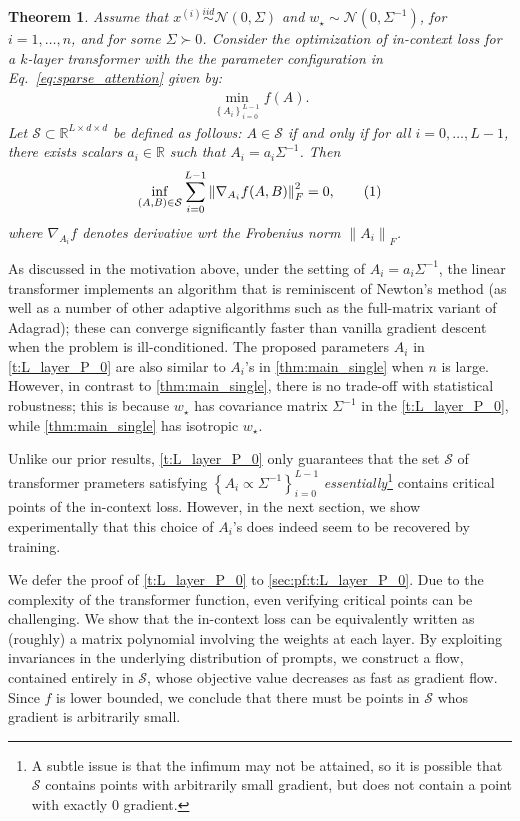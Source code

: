 \documentclass{article}
\newcommand{\R}{\mathbb{R}}
\renewcommand{\S}{{\mathcal S}}
\newtheorem{theorem}{Theorem}
\newcommand{\bb}{A}
\newcommand{\wstar}{w_\star}
\newcommand{\tx}[1]{x^{(#1)}}
\newcommand*\lrn[1]{\left\| #1 \right\|}
\newcommand*\lrp[1]{\left( #1 \right)}
\newcommand*\lrbb[1]{\left\{ #1 \right\}}
\newcommand\numberthis{\addtocounter{equation}{1}\tag{\theequation}}
\begin{document}
\begin{theorem}\label{t:L_layer_P_0}  
Assume that $\tx{i} \overset{iid}{\sim} \mathcal{N}(0,\Sigma)$ and $\wstar \sim \mathcal{N}(0,\Sigma^{-1})$, for $i=1,\dots, n$, and for some $\Sigma \succ 0$. Consider the optimization of in-context loss for a $k$-layer transformer with the the parameter configuration in Eq.~\eqref{eq:sparse_attention} given by:
\begin{align}
\min_{\lrbb{A_i}_{i=0}^{L-1}} f \lrp{A}.
\end{align}
Let $\S \subset \R^{L \times d \times d}$ be defined as follows: $A \in \S$ if and only if for all $i = 0,\dots,L-1$, there exists scalars $a_i\in \R$ such that $A_i = a_i \Sigma^{-1}$. Then
\begin{align*}
\inf_{(A,B) \in \S} \sum_{i=0}^{L-1} \lrn{\nabla_{A_i} f(A,B)}_F^2 = 0,
\numberthis \label{e:T:near-stationarity_P0}
\end{align*}
where $\nabla_{A_i} f$ denotes derivative wrt the Frobenius norm $\lrn{A_i}_F$.

\end{theorem}

As discussed in the motivation above, under the setting of $A_i = a_i \Sigma^{-1}$, the linear transformer implements an algorithm that is reminiscent of Newton's method (as well as a number of other adaptive algorithms such as the full-matrix variant of Adagrad); these can converge significantly faster than vanilla gradient descent when the problem is ill-conditioned. The proposed parameters $A_i$ in \autoref{t:L_layer_P_0} are also similar to $\bb_i$'s in \autoref{thm:main_single} when $n$ is large. However, in contrast to \autoref{thm:main_single}, there is no trade-off with statistical robustness; this is because $\wstar$ has covariance matrix $\Sigma^{-1}$ in the \autoref{t:L_layer_P_0}, while \autoref{thm:main_single} has isotropic $\wstar$.

Unlike our prior results, \autoref{t:L_layer_P_0} only guarantees that the set $\S$ of transformer prameters satisfying $\lrbb{A_i \propto \Sigma^{-1}}_{i=0}^{L-1}$ \emph{essentially}\footnote{A subtle issue is that the infimum may not be attained, so it is possible that $\S$ contains points with arbitrarily small gradient, but does not contain a point with exactly $0$ gradient.} contains critical points of the in-context loss. However, in the next section, we show experimentally that this choice of $A_i$'s does indeed seem to be recovered by training. 

We defer the proof of \autoref{t:L_layer_P_0} to \autoref{sec:pf:t:L_layer_P_0}. Due to the complexity of the transformer function, even verifying critical points can be challenging. We show that the in-context loss can be equivalently written as (roughly) a matrix polynomial involving the weights at each layer. By exploiting invariances in the underlying distribution of prompts, we construct a flow, contained entirely in $\S$, whose objective value decreases as fast as gradient flow. Since $f$ is lower bounded, we conclude that there must be points in $\S$ whos gradient is arbitrarily small.
\end{document}
